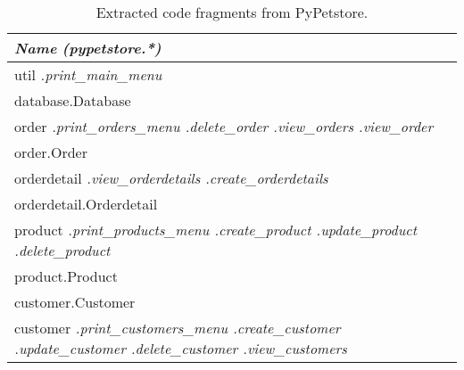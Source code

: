 \begin{table}[h]
    \footnotesize
    \centering
    \captionsetup{justification=centering ,margin=1.5cm, labelfont=bf, font=footnotesize}
    \caption{Extracted code fragments from PyPetstore.}\label{tab:pypetstore_code_fragments}
    \begin{tabular}{ >{\raggedright\arraybackslash}m{160pt}}
        \toprule
        \textit{Name} \newline \textit{(pypetstore.*)}\\
        \midrule
        util \newline
        \textit{.print\_main\_menu}
        \\
        \midrule
        database.Database\\
        \midrule
        order\newline
        \textit{
        .print\_orders\_menu \newline
        .delete\_order \newline
        .view\_orders \newline
        .view\_order}\\
        \midrule
        order.Order\\
        \midrule
        orderdetail\newline
        \textit{
        .view\_orderdetails \newline
        .create\_orderdetails}\\
        \midrule
        orderdetail.Orderdetail\\
        \midrule
        product\newline
        \textit{
        .print\_products\_menu \newline
        .create\_product \newline
        .update\_product \newline
        .delete\_product}\\
        \midrule
        product.Product\\
        \midrule
        customer.Customer\\
        \midrule
        customer\newline
        \textit{
        .print\_customers\_menu \newline
        .create\_customer \newline
        .update\_customer \newline
        .delete\_customer \newline
        .view\_customers}\\
        \bottomrule
    \end{tabular}  
\end{table}